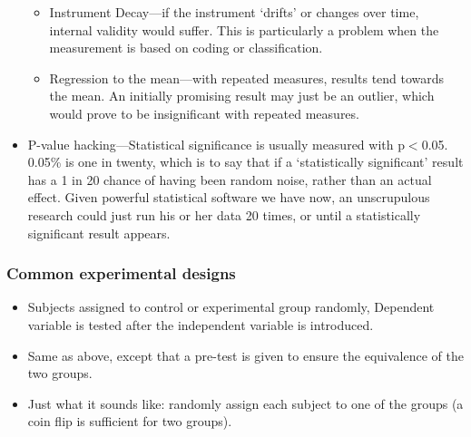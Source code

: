 \begin{refsection}
\begin{itemize}
\begin{itemize}
\item Instrument Decay---if the instrument ‘drifts’ or changes over time, internal validity would suffer. This is particularly a problem when the measurement is based on coding or classification.

\item Regression to the mean---with repeated measures, results tend towards the mean. An initially promising result may just be an outlier, which would prove to be insignificant with repeated measures.

\end{itemize}

\item P-value hacking---Statistical significance is usually measured with p$<$0.05. 0.05\% is one in twenty, which is to say that if a ‘statistically significant’ result has a 1 in 20 chance of having been random noise, rather than an actual effect. Given powerful statistical software we have now, an unscrupulous research could just run his or her data 20 times, or until a statistically significant result appears.

\end{itemize}

\subsubsection{Common experimental designs}
\label{commonexperimentaldesigns}


\begin{itemize}
\item Subjects assigned to control or experimental group randomly, Dependent variable is tested after the independent variable is introduced.

\end{itemize}


\begin{itemize}
\item Same as above, except that a pre-test is given to ensure the equivalence of the two groups.

\end{itemize}


\begin{itemize}
\item Just what it sounds like: randomly assign each subject to one of the groups (a coin flip is sufficient for two groups).


\end{itemize}
\end{refsection}
